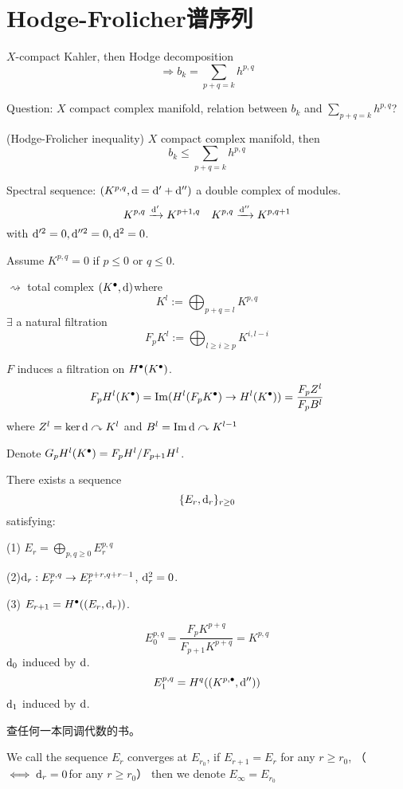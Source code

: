 \section{Hodge-Frolicher谱序列}
$X$-compact Kahler, then Hodge decomposition
$$\Rightarrow b_k=\sum_{p+q=k}h^{p,q}$$

Question: $X$ compact complex manifold, relation between
$b_k$ and $\sum\limits_{p+q=k}h^{p,q}$?

\begin{thm}(Hodge-Frolicher inequality)
$X$ compact complex manifold, then
$$b_k\leq\sum_{p+q=k} h^{p,q}$$
\end{thm}

Spectral sequence:
$(K^{p,q},\mathrm{d}=\mathrm{d}'+\mathrm{d}'')$ a double complex of modules.
$$K^{p,q}\xrightarrow{\mathrm{d}'}K^{p+1,q}\quad
K^{p,q}\xrightarrow{\mathrm{d}''}K^{p,q+1}$$
with $\mathrm{d}'^2=0,\mathrm{d}''^2=0,\mathrm{d}^2=0$.

Assume $K^{p,q}=0$ if $p\leq 0$ or $q\leq 0$.

$\rightsquigarrow$ total complex $(K^{\bullet},\mathrm{d})$where
$$K^l:=\bigoplus_{p+q=l}K^{p,q}$$
$\exists$ a natural filtration
$$F_pK^l:=\bigoplus_{l\geq i\geq p}K^{i,l-i}$$

$F$ induces a filtration on $H^{\bullet}(K^{\bullet})$.
$$F_pH^l(K^{\bullet})=\operatorname{Im}(H^l(F_pK^{\bullet})\to H^l(K^{\bullet}))
=\frac{F_p Z^l}{F_p B^l}$$
where $Z^l=\ker \mathrm{d}\curvearrowright K^l$ and $B^l=\operatorname{Im}\mathrm{d}\curvearrowright K^{l-1}$

Denote $G_pH^l(K^{\bullet})=F_pH^l/F_{p+1}H^l$.

\begin{thm}There exists a sequence
$$\{E_r,\mathrm{d}_r\}_{r\geq 0}$$
satisfying:

(1) $E_r=\bigoplus\limits_{p,q\geq 0}E_r^{p,q}$

(2)$\mathrm{d}_r:E_r^{p,q}\to E_r^{p+r,q+r-1}$, $\mathrm{d}_r^2=0$.

(3) $E_{r+1}=H^{\bullet}((E_r,\mathrm{d}_r))$.

\end{thm}

$$E_0^{p,q}=\frac{F_p K^{p+q}}{F_{p+1}K^{p+q}}=K^{p,q}$$
$\mathrm{d}_0$ induced by $\mathrm{d}$.
$$E_1^{p,q}=H^q((K^{p,\bullet},\mathrm{d}''))$$
$\mathrm{d}_1$ induced by $\mathrm{d}$.

查任何一本同调代数的书。

\begin{definition}
We call the sequence ${E_r}$ converges at $E_{r_0}$,
if $E_{r+1}=E_r$ for any $r\geq r_0$,
（$\iff\mathrm{d}_r=0$for any $r\geq r_0$）
then we denote $E_\infty=E_{r_0}$
\end{definition}

